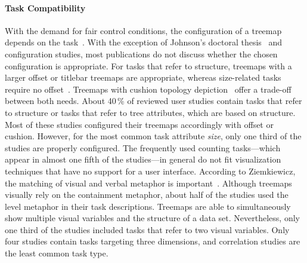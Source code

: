\documentclass[sigconf,
natbib=true]{acmart}
\begin{document}
\paragraph{\textbf{Task Compatibility}} %
With the demand for fair control conditions, the configuration of a treemap depends on the task~\cite{johnson1993-categorical}.
With the exception of Johnson's doctoral thesis~\cite{johnson1993-categorical} and configuration studies, most publications do not discuss whether the chosen configuration is appropriate.
For tasks that refer to structure, treemaps with a larger offset or titlebar treemaps are appropriate, whereas size-related tasks require no offset~\cite{johnson1993-categorical}.
Treemaps with cushion topology depiction~\cite{vanwijk1999-cushion} offer a trade-off between both needs.
About 40\,\% of reviewed user studies contain tasks that refer to structure or tasks that refer to tree attributes, which are based on structure.
Most of these studies configured their treemaps accordingly with offset or cushion.
However, for the most common task attribute \emph{size}, only one third of the studies are properly configured. %
The frequently used counting tasks---which appear in almost one fifth of the studies---in general do not fit visualization techniques that have no support for a user interface.
According to Ziemkiewicz, the matching of visual and verbal metaphor is important~\cite{ziemkiewicz2008-metaphors}.
Although treemaps visually rely on the containment metaphor, about half of the studies used the level metaphor in their task descriptions.
Treemaps are able to simultaneously show multiple visual variables and the structure of a data set.
Nevertheless, only one third of the studies included tasks that refer to two visual variables.
Only four studies contain tasks targeting three dimensions, and correlation studies are the least common task type.
\end{document}
